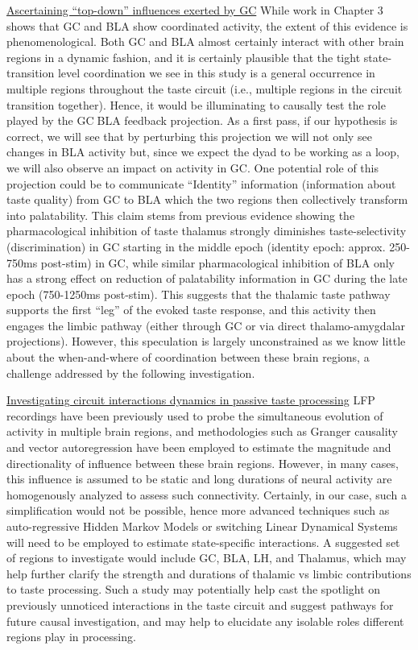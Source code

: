 \begin{refsection}
\smallskip
\noindent \underline{Ascertaining “top-down” influences exerted by GC} While work in Chapter 3 shows that GC and BLA show coordinated activity, the extent of this evidence is phenomenological. Both GC and BLA almost certainly interact with other brain regions in a dynamic fashion, and it is certainly plausible that the tight state-transition level coordination we see in this study is a general occurrence in multiple regions throughout the taste circuit (i.e., multiple regions in the circuit transition together). Hence, it would be illuminating to causally test the role played by the GCBLA feedback projection. As a first pass, if our hypothesis is correct, we will see that by perturbing this projection we will not only see changes in BLA activity but, since we expect the dyad to be working as a loop, we will also observe an impact on activity in GC. One potential role of this projection could be to communicate “Identity” information (information about taste quality) from GC to BLA which the two regions then collectively transform into palatability. This claim stems from previous evidence showing the pharmacological inhibition of taste thalamus strongly diminishes taste-selectivity (discrimination) in GC starting in the middle epoch (identity epoch: approx. 250-750ms post-stim) in GC, while similar pharmacological inhibition of BLA only has a strong effect on reduction of palatability information in GC during the late epoch (750-1250ms post-stim). This suggests that the thalamic taste pathway supports the first “leg” of the evoked taste response, and this activity then engages the limbic pathway (either through GC or via direct thalamo-amygdalar projections). However, this speculation is largely unconstrained as we know little about the when-and-where of coordination between these brain regions, a challenge addressed by the following investigation.

\smallskip
\noindent \underline{Investigating circuit interactions dynamics in passive taste processing} LFP recordings have been previously used to probe the simultaneous evolution of activity in multiple brain regions, and methodologies such as Granger causality and vector autoregression have been employed to estimate the magnitude and directionality of influence between these brain regions. However, in many cases, this influence is assumed to be static and long durations of neural activity are homogenously analyzed to assess such connectivity. Certainly, in our case, such a simplification would not be possible, hence more advanced techniques such as auto-regressive Hidden Markov Models or switching Linear Dynamical Systems will need to be employed to estimate state-specific interactions. A suggested set of regions to investigate would include GC, BLA, LH, and Thalamus, which may help further clarify the strength and durations of thalamic vs limbic contributions to taste processing. Such a study may potentially help cast the spotlight on previously unnoticed interactions in the taste circuit and suggest pathways for future causal investigation, and may help to elucidate any isolable roles different regions play in processing.


\end{refsection}

